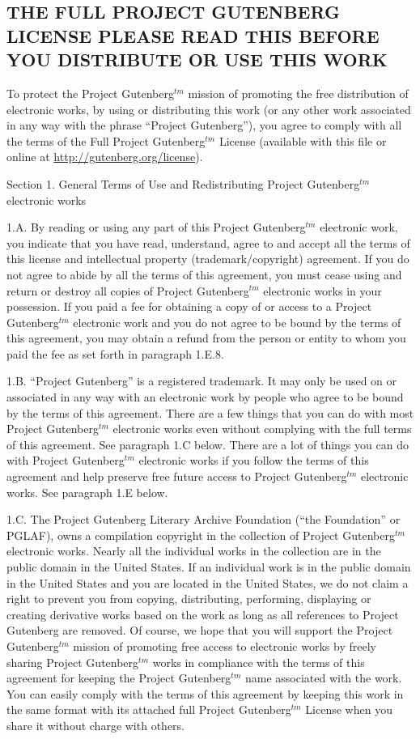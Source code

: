 \subsection*{THE FULL PROJECT GUTENBERG LICENSE PLEASE READ THIS BEFORE YOU DISTRIBUTE OR USE THIS WORK}

To protect the Project Gutenberg$^{tm}$ mission of promoting the free
distribution of electronic works, by using or distributing this work
(or any other work associated in any way with the phrase “Project
Gutenberg”), you agree to comply with all the terms of the Full Project
Gutenberg$^{tm}$ License (available with this file or online at
\url{http://gutenberg.org/license}).

Section 1.  General Terms of Use and Redistributing Project Gutenberg$^{tm}$
electronic works

1.A.  By reading or using any part of this Project Gutenberg$^{tm}$
electronic work, you indicate that you have read, understand, agree to
and accept all the terms of this license and intellectual property
(trademark/copyright) agreement.  If you do not agree to abide by all
the terms of this agreement, you must cease using and return or destroy
all copies of Project Gutenberg$^{tm}$ electronic works in your possession.
If you paid a fee for obtaining a copy of or access to a Project
Gutenberg$^{tm}$ electronic work and you do not agree to be bound by the
terms of this agreement, you may obtain a refund from the person or
entity to whom you paid the fee as set forth in paragraph 1.E.8.

1.B.  “Project Gutenberg” is a registered trademark.  It may only be
used on or associated in any way with an electronic work by people who
agree to be bound by the terms of this agreement.  There are a few
things that you can do with most Project Gutenberg$^{tm}$ electronic works
even without complying with the full terms of this agreement.  See
paragraph 1.C below.  There are a lot of things you can do with Project
Gutenberg$^{tm}$ electronic works if you follow the terms of this agreement
and help preserve free future access to Project Gutenberg$^{tm}$ electronic
works.  See paragraph 1.E below.

1.C.  The Project Gutenberg Literary Archive Foundation (“the Foundation”
 or PGLAF), owns a compilation copyright in the collection of Project
Gutenberg$^{tm}$ electronic works.  Nearly all the individual works in the
collection are in the public domain in the United States.  If an
individual work is in the public domain in the United States and you are
located in the United States, we do not claim a right to prevent you from
copying, distributing, performing, displaying or creating derivative
works based on the work as long as all references to Project Gutenberg
are removed.  Of course, we hope that you will support the Project
Gutenberg$^{tm}$ mission of promoting free access to electronic works by
freely sharing Project Gutenberg$^{tm}$ works in compliance with the terms of
this agreement for keeping the Project Gutenberg$^{tm}$ name associated with
the work.  You can easily comply with the terms of this agreement by
keeping this work in the same format with its attached full Project
Gutenberg$^{tm}$ License when you share it without charge with others.

